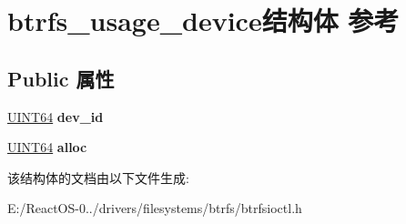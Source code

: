 \hypertarget{structbtrfs__usage__device}{}\section{btrfs\+\_\+usage\+\_\+device结构体 参考}
\label{structbtrfs__usage__device}
\subsection*{Public 属性}
\begin{DoxyCompactItemize}
\item 
\mbox{\label{structbtrfs__usage__device_a0dcb1168e7ba9097d43be80c506a0590}} 
\hyperlink{_processor_bind_8h_a57be03562867144161c1bfee95ca8f7c}{U\+I\+N\+T64} {\bfseries dev\+\_\+id}
\item 
\mbox{\label{structbtrfs__usage__device_a2abc9b1f5a182d276bf2d83403a3e137}} 
\hyperlink{_processor_bind_8h_a57be03562867144161c1bfee95ca8f7c}{U\+I\+N\+T64} {\bfseries alloc}
\end{DoxyCompactItemize}


该结构体的文档由以下文件生成\+:\begin{DoxyCompactItemize}
\item 
E\+:/\+React\+O\+S-\/0../drivers/filesystems/btrfs/btrfsioctl.\+h\end{DoxyCompactItemize}
